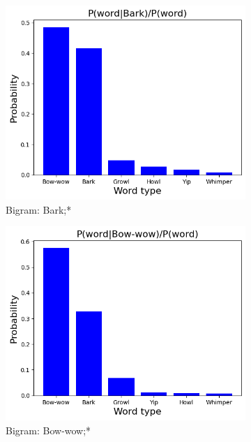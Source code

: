 \begin{figure}[th]
    \centering
    \begin{subfigure}[b]{0.3\textwidth}
	\centering
    	\includegraphics[width=\textwidth]{images/Bark.png}
	\caption{Bigram: Bark;*}
    \end{subfigure}
    \begin{subfigure}[b]{0.3\textwidth}
	\centering
	\includegraphics[width=\textwidth]{images/Bow-wow.png}
	\caption{Bigram: Bow-wow;*}
    \end{subfigure}
    \begin{subfigure}[b]{0.3\textwidth}

\end{subfigure}
\end{figure}
